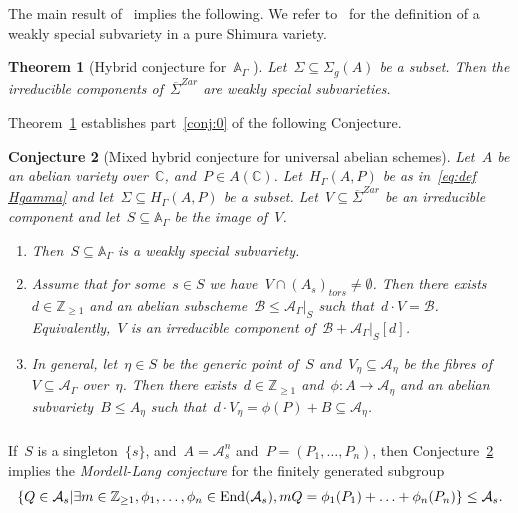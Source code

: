 \documentclass[12pt]{amsart}
\newtheorem{theorem}{Theorem}[section]
\newtheorem{conjecture}[theorem]{Conjecture}
\newcommand{\End}{{\rm End}}
\newcommand{\Z}{{\mathbb Z}}
\newcommand{\C}{{\mathbb C}}
\newcommand{\A}{{\mathbb A}}
\newcommand{\ol}{\overline}
\begin{document}
The main result of~\cite{RY:LMS2} implies the following. We refer to~\cite{RY:LMS2} for the definition of a weakly special subvariety in a pure Shimura variety.
\begin{theorem}[Hybrid conjecture for~$\A_\Gamma$ \cite{RY:LMS2}]\label{thm:IHES}
Let~$\Sigma\subseteq \Sigma_g(A)$ be a subset. Then the irreducible components of~$\ol{\Sigma}^{Zar}$ are weakly special subvarieties.
\end{theorem}


Theorem~\ref{thm:IHES} establishes part~\eqref{conj:0} of the following Conjecture.
\begin{conjecture}[Mixed hybrid conjecture for universal abelian schemes]
\label{conj}
Let~$A$ be an abelian variety over~$\C$, and~$P\in A(\C)$. Let~$H_{\Gamma}(A,P)$ be as in~\eqref{eq:def Hgamma} and let~$\Sigma\subseteq H_{\Gamma}(A,P)$ be a subset. Let~$V\subseteq \ol{\Sigma}^{Zar}$ be an irreducible component and let~$S\subseteq \A_\Gamma$ be the image of~$V$.
\begin{enumerate}\setcounter{enumi}{0}
\item \label{conj:0} Then~$S\subseteq \A_\Gamma$ is a weakly special subvariety.
\item \label{conj:1}
Assume that for some~$s\in S$ we have~$V\cap (A_s)_{tors}\neq \emptyset$. Then there exists~$d\in \Z_{\geq1}$ and an abelian subscheme~$\mathcal{B}\leq \mathcal{A}_{\Gamma}|_S$ such that~$d\cdot V=\mathcal{B}$. Equivalently,~$V$ is an irreducible component of~$\mathcal{B}+\mathcal{A}_{\Gamma}|_S[d]$.
\item \label{conj:2}
In general, let~$\eta\in S$ be the generic point of~$S$ and~$V_\eta\subseteq \mathcal{A}_\eta$ be the fibres of~$V\subseteq \mathcal{A}_\Gamma$ over~$\eta$.  
Then there exists~$d\in \Z_{\geq1}$ and~$\phi:A\to \mathcal{A}_\eta$ and an abelian subvariety~$B\leq A_\eta$ such that~$d\cdot V_\eta=\phi(P)+B\subseteq \mathcal{A}_\eta$.
\end{enumerate}
\end{conjecture}
\subsubsection{}\label{sec:mordell lang case}

If~$S$ is a singleton~$\{s\}$, and~$A=\mathcal{A}^n_s$ and~$P=(P_1,\ldots,P_n)$, then Conjecture~\ref{conj} implies the \emph{Mordell-Lang conjecture} for the finitely generated subgroup
\[\{Q\in \mathcal{A}_s|\exists m\in\Z_{\geq1},\phi_1,\ldots,\phi_n\in\End(\mathcal{A}_s), mQ=\phi_1(P_1)+\ldots+\phi_n(P_n)\}\leq \mathcal{A}_s.\]
\end{document}
